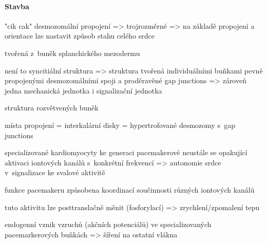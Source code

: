 \documentclass[DIV=8]{scrreprt}
\begin{document}
\paragraph{Stavba}
\begin{myItemize}[nosep]
    \item "cik cak" desmozomální propojení => trojrozměrné => na základě propojení a orientace lze nastavit způsob stahu celého srdce
    \item tvořená z buněk splanchického mezodermu
    \item není to syncitiální struktura => struktura tvořená individuálními buňkami pevně propojenými desmozomálními spoji a proděravěné gap junctions => zároveň jedna mechanická jednotka i signalizační jednotka
    \item struktura rozvětvených buněk
\begin{myItemize}[nosep]
    \item místa propojení = interkalární disky = hypertrofované desmozomy s gap junctions
\end{myItemize}

    \item specializované kardiomyocyty ke generaci pacemakerové neustále se opakující aktivaci iontových kanálů s konkrétní frekvencí => autonomie srdce v signalizace ke svalové aktivitě
\begin{myItemize}[nosep]
    \item funkce pacemakeru způsobena koordinací součinnosti různých iontových kanálů
    \item tuto aktivitu lze posttranslačně měnit (fosforylací) => zrychlení/zpomalení tepu
    \item endogenní vznik vzruchů (akčních potenciálů) ve specializovaných pacemarkerových buňkách => šíření na     ostatní vlákna
\end{myItemize}

\end{myItemize}
\end{document}
